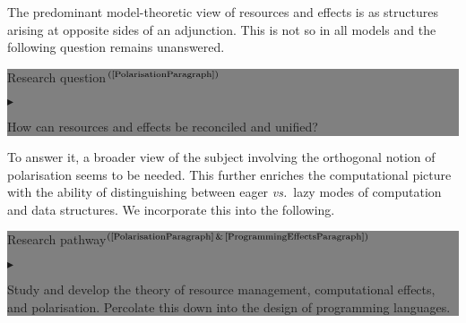 \documentclass[11pt,twocolumn]{article}
\newenvironment{btritemize}
  {\begin{list}{\btr}
  {\setlength{\topsep}{2pt}
   \setlength{\partopsep}{2pt}
   \setlength{\itemsep}{2.5pt}
   \setlength{\parsep}{2.5pt}
   \setlength{\leftmargin}{1em}
   \setlength{\labelwidth}{.5em}}}
  {\end{list}}
\newcommand{\mytextsf}[1]{\textsf{\small #1}}
\newcommand{\hide}[1]{}
\newcommand{\pref}[1]{\,(\ref{#1})}
\newcommand{\eg}{\emph{eg.}}
\newcommand{\vs}{\emph{vs.}}
\newcommand{\btr}{$\blacktriangleright$}
\newcommand{\reqpsize}{8.113395cm}%
\newcommand{\req}[2]{\begin{center}\colorbox{grey}{\begin{minipage}{\reqpsize} 
  \mytextsf{Research question}\hfill$^{\mbox{\scriptsize #1 }}$\\[-5.5mm]
  \begin{btritemize}
  \item #2
  \end{btritemize}
\end{minipage}}\end{center}}
\newcommand{\rep}[2]{\begin{center}\colorbox{grey}{\begin{minipage}{\reqpsize}
  \mytextsf{Research pathway}\hfill$^{\mbox{\scriptsize #1 }}$\\[-5.5mm]
  \begin{btritemize}
  \item #2
  \end{btritemize}
\end{minipage}}\end{center}}
\newcommand{\cat}[1]{\mathscr{#1}}
\begin{document}
\hide{
From the viewpoint of categorical models, the resource and effect management
structures are respectively seen as comonadic and monadic structures.
Comonads and monads being dual categorical concepts that arose in the context
of cohomology theory in the 1960s~\cite{BeckThesis}.

A classical basic result of category theory establishes a strong
correspondence between (co)monads and adjoint functors
(see~\eg~\cite{MacLane}).  One aspect of this is that every adjunction
  \begin{equation}\label{ResourceEffectAdjunction}
  \xymatrix@C=40pt{
    \cat D \ar@/^.75em/[r]|(.625){\mbox{$\,G\,$}}\ar@{}[r]|-\swvdash&
    \ar@/^.75em/[l]|(.625){\mbox{$\,F\,$}} \cat C }
\end{equation}
with $F$ and $G$ respectively left and right adjoint to each other, gives
rise (by composition) to a comonad on $\cat D$ and a monad on $\cat C$.  This
viewpoint gave impetus to further analyses based on the more primitive notion
of adjunction.  

Models of Linear Logic are founded on the theory of
monoidal categories~\cite[Chapter~VII.1]{MacLane}.  For them, one requests
that the adjunction be monoidal with respect to linear structure on $\cat D$
and cartesian (or multiplicative) structure on $\cat C$
(see~\eg~\cite{MelliesCMLL}).  On the other hand, models of Computational
\mbox{$\lambda$-calculi} rely on enriched category theory~\cite{KellyBook}.
Here, the structure is roughly given by an enriched adjunction with $\cat C$
cartesian and $\cat D$ with powers (or exponentials) relative to $\cat C$.
}

\hide{
In the context of Linear Logic, examples are the mixed linear/cartesian models
and calculi of Benton and Wadler, %
and of Barber and Plotkin. %
In the context of effect calculi, examples are the Call-By-Push-Value of
Levy. %
and the Enriched Effect Calculus of 
Egger, M{\o}gelberg, and Simpson. %
}
The predominant model-theoretic view of resources and effects is as
structures arising at opposite sides of an adjunction.  This is not so in
all models and the following question remains unanswered.
%
\req{\pref{PolarisationParagraph}}
  {How can resources and effects be reconciled and unified?}
%
To answer it, a broader view of the subject involving the orthogonal
notion of polarisation seems to be needed.  
This %
further enriches the computational picture with the ability of
distinguishing between eager \vs~lazy modes of computation and data
structures.  We incorporate this into the following.
%
\rep{(\ref{PolarisationParagraph}\,\&\,\ref{ProgrammingEffectsParagraph})}
  {Study and develop the theory of resource management, computational
    effects, and polarisation.  Percolate this down into the design of
    programming languages.}
\end{document}
